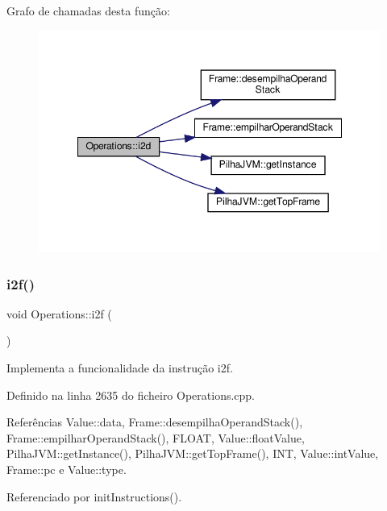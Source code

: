 Grafo de chamadas desta função\+:
\nopagebreak
\begin{figure}[H]
\begin{center}
\leavevmode
\includegraphics[width=348pt]{classOperations_aee9ee24acc934bcf51340dc54d6ed231_cgraph}
\end{center}
\end{figure}
\mbox{\label{classOperations_a4880878630a620c325840fc7980dc131}} 
\subsubsection{\texorpdfstring{i2f()}{i2f()}}
{\footnotesize\ttfamily void Operations\+::i2f (\begin{DoxyParamCaption}{ }\end{DoxyParamCaption})\hspace{0.3cm}{\ttfamily [private]}}



Implementa a funcionalidade da instrução i2f. 



Definido na linha 2635 do ficheiro Operations.\+cpp.



Referências Value\+::data, Frame\+::desempilha\+Operand\+Stack(), Frame\+::empilhar\+Operand\+Stack(), F\+L\+O\+AT, Value\+::float\+Value, Pilha\+J\+V\+M\+::get\+Instance(), Pilha\+J\+V\+M\+::get\+Top\+Frame(), I\+NT, Value\+::int\+Value, Frame\+::pc e Value\+::type.



Referenciado por init\+Instructions().

